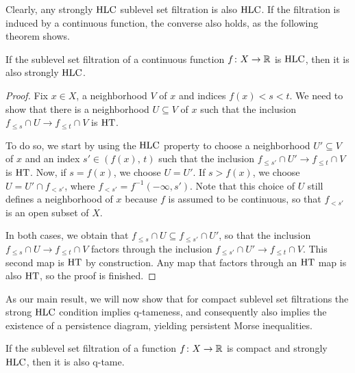 Clearly, any strongly $\mathrm{HLC}$ sublevel set filtration is also $\mathrm{HLC}$. If the filtration is induced by a continuous function, the converse also holds, as the following theorem shows.

\begin{thm}\label{thm:hlc_to_strong_hlc}
    If the sublevel set filtration of a continuous function $f \colon X \to \mathbb{R}$ is $\mathrm{HLC}$, then it is also strongly $\mathrm{HLC}$.
\end{thm}
\begin{proof}
    Fix $x \in X$, a neighborhood $V$ of $x$ and indices $f(x) < s < t$. We need to show that there is a neighborhood $U \subseteq V$ of $x$ such that the inclusion $f_{\leq s} \cap U \to f_{\leq t} \cap V$ is $\mathrm{HT}$. 
    
    To do so, we start by using the $\mathrm{HLC}$ property to choose a neighborhood $U' \subseteq V$ of $x$ and an index $s' \in (f(x),\, t)$ such that the inclusion $f_{\leq s'} \cap U' \to f_{\leq t} \cap V$ is $\mathrm{HT}$. 
    Now, if $s = f(x)$, we choose $U = U'$. 
    If $s > f(x)$, we choose $U = U' \cap f_{< s'}$, where $f_{< s'} = f^{-1} (-\infty, s')$.
    Note that this choice of $U$ still defines a neighborhood of $x$ because $f$ is assumed to be continuous, so that $f_{< s'}$ is an open subset of $X$.
    
    In both cases, we obtain that $f_{\leq s} \cap U \subseteq f_{\leq s'} \cap U'$, so that the inclusion $f_{\leq s} \cap U \to f_{\leq t} \cap V$ factors through the inclusion $f_{\leq s'} \cap U' \to f_{\leq t} \cap V$. This second map is $\mathrm{HT}$ by construction. Any map that factors through an $\mathrm{HT}$ map is also $\mathrm{HT}$, so the proof is finished.
\end{proof}


As our main result, we will now show that for compact sublevel set filtrations the strong $\mathrm{HLC}$ condition implies q-tameness, and consequently also implies the existence of a persistence diagram, yielding persistent Morse inequalities.

\begin{thm} \label{t:strong local connectedness implies q-tameness}
	If the sublevel set filtration of a function $f \colon X \to \mathbb{R}$ is compact and strongly $\mathrm{HLC}$, then it is also q-tame.
\end{thm}

